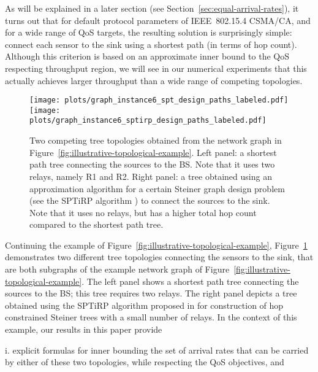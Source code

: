 \documentclass[12pt, draftclsnofoot, onecolumn]{IEEEtran}
\newcommand{\gap}{\vspace{2mm}}
\begin{document}
As will be explained in a later section (see Section~\ref{sec:equal-arrival-rates}), it turns out that for default protocol parameters of IEEE~802.15.4 CSMA/CA, and for a wide range of QoS targets, the resulting solution is surprisingly simple: connect each sensor to the sink using a shortest path (in terms of hop count). Although this criterion is based on an approximate inner bound to the QoS respecting throughput region, we will see in our numerical experiments that this actually achieves larger throughput than a wide range of competing topologies. 

\begin{figure}[t]
\footnotesize
\begin{center}
\texttt{[image: plots/graph\_instance6\_spt\_design\_paths\_labeled.pdf]}
\hspace{1mm}
\texttt{[image: plots/graph\_instance6\_sptirp\_design\_paths\_labeled.pdf]}
\caption{Two competing tree topologies obtained from the network graph in Figure~\ref{fig:illustrative-topological-example}. Left panel: a shortest path tree connecting the sources to the BS. Note that it uses two relays, namely R1 and R2. Right panel: a tree obtained using an approximation algorithm for a certain Steiner graph design problem (see the SPTiRP algorithm \cite{bhattacharya-kumar14comnet}) to connect the sources to the sink. Note that it uses no relays, but has a higher total hop count compared to the shortest path tree.}
\label{fig:competing-topologies}
\vspace{-5mm}
\end{center}
\normalsize
\end{figure}
Continuing the example of Figure~\ref{fig:illustrative-topological-example}, Figure~\ref{fig:competing-topologies} demonstrates two different tree topologies connecting the sensors to the sink, that are both subgraphs of the example network graph of Figure~\ref{fig:illustrative-topological-example}. The left panel shows a shortest path tree connecting the sources to the BS; this tree requires two relays. The right panel depicts a tree obtained using the SPTiRP algorithm proposed in \cite{bhattacharya-kumar14comnet} for construction of hop constrained Steiner trees with a small number of relays. In the context of this example, our results in this paper provide

\gap
\noindent
i. explicit formulas for inner bounding the set of arrival rates that can be carried by either of these two topologies, while respecting the QoS objectives, and 
\end{document}
